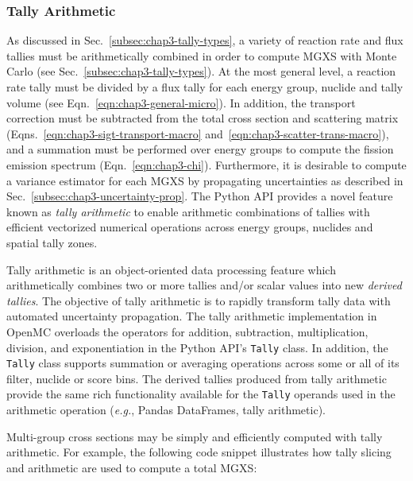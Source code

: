 \subsubsection{Tally Arithmetic}
\label{subsubsec:chap4-tally-arithmetic}

As discussed in Sec.~\ref{subsec:chap3-tally-types}, a variety of reaction rate and flux tallies must be arithmetically combined in order to compute \ac{MGXS} with Monte Carlo (see Sec.~\ref{subsec:chap3-tally-types}). At the most general level, a reaction rate tally must be divided by a flux tally for each energy group, nuclide and tally volume (see Eqn.~\ref{eqn:chap3-general-micro}). In addition, the transport correction must be subtracted from the total cross section and scattering matrix (Eqns.~\ref{eqn:chap3-sigt-transport-macro} and~\ref{eqn:chap3-scatter-trans-macro}), and a summation must be performed over energy groups to compute the fission emission spectrum (Eqn.~\ref{eqn:chap3-chi}). Furthermore, it is desirable to compute a variance estimator for each \ac{MGXS} by propagating uncertainties as described in Sec.~\ref{subsec:chap3-uncertainty-prop}. The Python \ac{API} provides a novel feature known as \textit{tally arithmetic} to enable arithmetic combinations of tallies with efficient vectorized numerical operations across energy groups, nuclides and spatial tally zones.

Tally arithmetic is an object-oriented data processing feature which arithmetically combines two or more tallies and/or scalar values into new \textit{derived tallies}. The objective of tally arithmetic is to rapidly transform tally data with automated uncertainty propagation. The tally arithmetic implementation in OpenMC overloads the operators for addition, subtraction, multiplication, division, and exponentiation in the Python \ac{API}'s \texttt{Tally} class. In addition, the \texttt{Tally} class supports summation or averaging operations across some or all of its filter, nuclide or score bins.  The derived tallies produced from tally arithmetic provide the same rich functionality available for the \texttt{Tally} operands used in the arithmetic operation (\textit{e.g.}, Pandas DataFrames, tally arithmetic).

Multi-group cross sections may be simply and efficiently computed with tally arithmetic. For example, the following code snippet illustrates how tally slicing and arithmetic are used to compute a total \ac{MGXS}:



